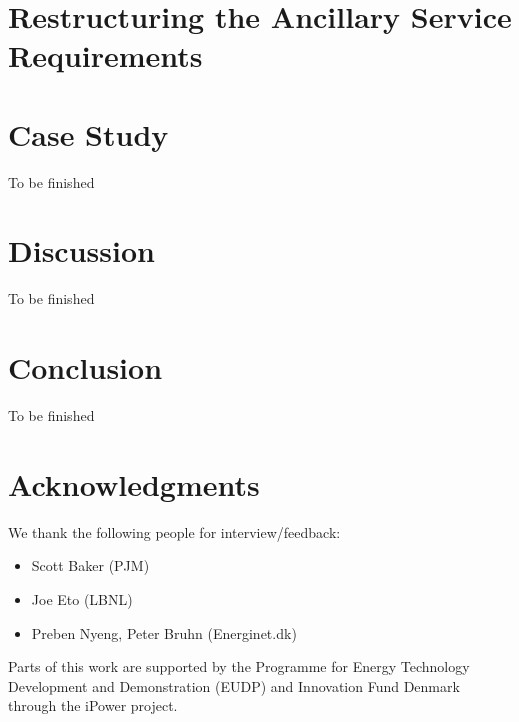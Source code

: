 \section{Restructuring the Ancillary Service Requirements}
\label{sec:newas}


%

%

\section{Case Study}
\label{sec:ddrascasestudy}
%
To be finished

\section{Discussion}
\label{sec:ddrasdiscussion}
%
To be finished
\section{Conclusion}
\label{sec:ddrasconclusion}
%
To be finished
\section*{Acknowledgments}
We thank the following people for interview/feedback:
\begin{itemize}
	\item Scott Baker (PJM)
	\item Joe Eto (LBNL)
	\item Preben Nyeng, Peter Bruhn (Energinet.dk)
\end{itemize}
Parts of this work are supported by the Programme for Energy Technology Development and Demonstration (EUDP) and Innovation Fund Denmark through the iPower project.